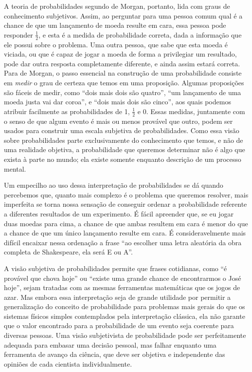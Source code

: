 \documentclass[12pt,a4paper]{article}
\begin{document}
A teoria de probabilidades segundo de Morgan, portanto, lida com graus de conhecimento subjetivos. Assim, ao perguntar para
uma pessoa comum qual é a chance de que um lançamento de moeda resulte em cara, essa pessoa pode responder $\frac{1}{2}$, e 
esta é a medida de probabilidade correta, dada a informação que ele possui sobre o problema. Uma outra pessoa, que sabe
que esta moeda é viciada, ou que é capaz de jogar a moeda de forma a privilegiar um resultado, pode dar outra resposta
completamente diferente, e ainda assim estará correta. Para de Morgan, o passo essencial na construção de uma probabilidade
consiste em {\em medir} o grau de certeza que temos em uma proposição. Algumas proposições são fáceis de medir, como
``dois mais dois são quatro'', ``um lançamento de uma moeda justa vai dar coroa'', e ``dois mais dois são cinco'', aos quais
podemos atribuir facilmente as probabilidades de 1, $\frac{1}{2}$ e 0. Essas medidas, juntamente com o senso de que
algum evento é mais ou menos provável que outro, podem ser usados para construir uma escala subjetiva de probabilidades.
Como essa visão sobre probabilidades parte exclusivamente do conhecimento que temos, e não de uma realidade objetiva,
a probabilidade que queremos determinar não é algo que exista à parte no mundo; ela existe somente enquanto descrição
de um processo mental.

Um empecilho ao uso dessa interpretação de probabilidades se dá quando percebemos que, quanto mais complexo é o 
problema que queremos resolver, mais imperfeita se torna nossa sensação de conseguir ordenar a probabilidade referente
a diferentes resultados de um experimento. É fácil apreender que, se eu jogar duas moedas para cima, a chance de que ambas 
resultem em cara é menor do que a chance de que um único lançamento resulte em cara. É consideravelmente mais difícil encaixar
nessa ordenação a frase ``ao escolher uma letra aleatória da obra completa de Shakespeare, ela será E ou A''.

A visão subjetiva de probabilidades permite que frases cotidianas, como ``é provável que chova hoje'' ou ``existe uma grande
chance de encontrarmos o José hoje'', sejam tratadas com as mesmas ferramentas matemáticas que os jogos de azar. Mas
embora essa interpretação seja de grande utilidade por permitir a generalização do conceito de probabilidade para problemas
mais gerais do que os sistemas físicos simples contemplados pela interpretação clássica, ela não garante que o valor encontrado
para a probabilidade de um evento seja coerente para diversas pessoas. Uma visão subjetivista de probabilidade pode ser
perfeitamente adequada para embasar uma decisão pessoal, mas falhar enquanto uma ferramenta de avanço da ciência, que deve
ser objetiva e independente das opiniões de cada cientista individualmente.
\end{document}
